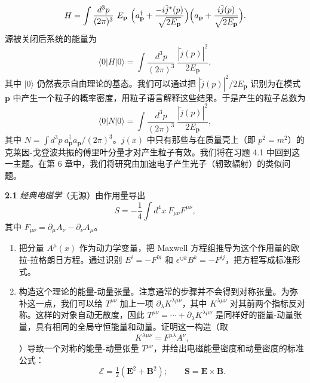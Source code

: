 \begin{equation}
  H = \int \frac{d^3p}{(2\pi)^3}\ E_{\mathbf{p}}\
    \Bigl( a_{\mathbf{p}}^\dagger
      + \frac{-i\tilde{j}^{*}(p)}{\sqrt{2E_{\mathbf{p}}}} \Bigr)
    \Bigl( a_{\mathbf{p}}
      + \frac{i\tilde{j}(p)}{\sqrt{2E_{\mathbf{p}}}} \Bigr) .
\end{equation}
源被关闭后系统的能量为
\begin{equation}
  \langle 0|H|0\rangle = \int \frac{d^3p}{(2\pi)^3}\
    \frac{|\tilde{j}(p)|^2}{2E_{\mathbf{p}}},
  \label{eq:2.65}
\end{equation}
其中 $|0\rangle$ 仍然表示自由理论的基态。我们可以通过把 $|\tilde{j}(p)|^2/2E_{\mathbf{p}}$ 识别为在模式 $\mathbf{p}$ 中产生一个粒子的概率密度，用粒子语言解释这些结果。于是产生的粒子总数为
\begin{equation}
  \langle 0|N|0\rangle = \int \frac{d^3p}{(2\pi)^3}\
    \frac{|\tilde{j}(p)|^2}{2E_{\mathbf{p}}},
  \label{eq:2.66}
\end{equation}
其中 $N = \int d^3p\ a_{\mathbf{p}}^\dagger a_{\mathbf{p}}/(2\pi)^3$。$j(x)$ 中只有那些与在质量壳上（即 $p^2=m^2$）的克莱因-戈登波共振的傅里叶分量才对产生粒子有效。我们将在习题 4.1 中回到这一主题。在第 6 章中，我们将研究由加速电子产生光子（轫致辐射）的类似问题。

\problems

\textbf{2.1} \emph{经典电磁学}（无源）由作用量导出
\begin{equation}
  S = -\frac{1}{4}\int d^4x\ F_{\mu\nu}F^{\mu\nu},
\end{equation}
其中 $F_{\mu\nu} = \partial_\mu A_\nu - \partial_\nu A_\mu$。
\begin{enumerate}[label=(\alph*)]
  \item 把分量 $A^\mu(x)$ 作为动力学变量，把 Maxwell 方程组推导为这个作用量的欧拉-拉格朗日方程。通过识别 $E^i = -F^{0i}$ 和 $\epsilon^{ijk}B^k = -F^{ij}$，把方程写成标准形式。
  \item 构造这个理论的能量-动量张量。注意通常的步骤并不会得到对称张量。为弥补这一点，我们可以给 $T^{\mu\nu}$ 加上一项 $\partial_\lambda K^{\lambda\mu\nu}$，其中 $K^{\lambda\mu\nu}$ 对其前两个指标反对称。这样的对象自动无散度，因此 $T^{\mu\nu} = \cdots + \partial_\lambda K^{\lambda\mu\nu}$ 是同样好的能量-动量张量，具有相同的全局守恒能量和动量。证明这一构造（取
    \begin{equation}
      K^{\lambda\mu\nu} = F^{\mu\lambda}A^\nu,
    \end{equation}
    ）导致一个对称的能量-动量张量 $T^{\mu\nu}$，并给出电磁能量密度和动量密度的标准公式：
    \begin{equation}
      \mathcal{E} = \tfrac{1}{2}(\mathbf{E}^2+\mathbf{B}^2);\qquad
      \mathbf{S} = \mathbf{E}\times\mathbf{B}.
    \end{equation}
\end{enumerate}


